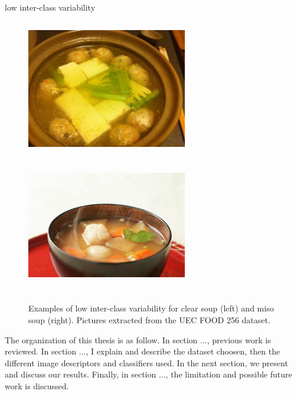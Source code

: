 low inter-class variability

\begin{figure}
    \centering
    \includegraphics[width=7cm, height=6cm]{img/clear_soup.jpg}
    \includegraphics[width=7cm, height=6cm]{img/miso_soup.jpg}
    \caption[Examples of low inter-class variability for kaya toast]{Examples of low inter-class variability for clear soup (left) and miso soup (right). Pictures extracted from the UEC FOOD 256 dataset.}
    \label{fig:inter-class_variability}
\end{figure}

The organization of this thesis is as follow. In section ..., previous work is reviewed. In section ..., I explain and describe the dataset choosen, then the different image descriptors and classifiers used. In the next section, we present and discuss our results. Finally, in section ..., the limitation and possible future work is discussed.


